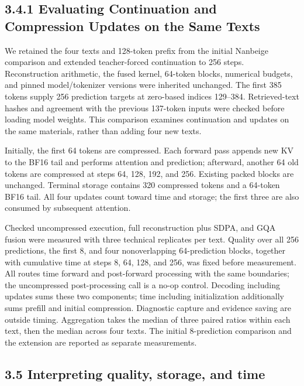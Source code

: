 \documentclass[10pt,a4paper]{article}
\begin{document}
\subsection{3.4.1 Evaluating Continuation and Compression Updates on the Same Texts}\label{evaluating-continuation-and-compression-updates-on-the-same-texts}

We retained the four texts and 128-token prefix from the initial Nanbeige comparison and extended teacher-forced continuation to 256 steps. Reconstruction arithmetic, the fused kernel, 64-token blocks, numerical budgets, and pinned model/tokenizer versions were inherited unchanged. The first 385 tokens supply 256 prediction targets at zero-based indices 129--384. Retrieved-text hashes and agreement with the previous 137-token inputs were checked before loading model weights. This comparison examines continuation and updates on the same materials, rather than adding four new texts.

Initially, the first 64 tokens are compressed. Each forward pass appends new KV to the BF16 tail and performs attention and prediction; afterward, another 64 old tokens are compressed at steps 64, 128, 192, and 256. Existing packed blocks are unchanged. Terminal storage contains 320 compressed tokens and a 64-token BF16 tail. All four updates count toward time and storage; the first three are also consumed by subsequent attention.

Checked uncompressed execution, full reconstruction plus SDPA, and GQA fusion were measured with three technical replicates per text. Quality over all 256 predictions, the first 8, and four nonoverlapping 64-prediction blocks, together with cumulative time at steps 8, 64, 128, and 256, was fixed before measurement. All routes time forward and post-forward processing with the same boundaries; the uncompressed post-processing call is a no-op control. Decoding including updates sums these two components; time including initialization additionally sums prefill and initial compression. Diagnostic capture and evidence saving are outside timing. Aggregation takes the median of three paired ratios within each text, then the median across four texts. The initial 8-prediction comparison and the extension are reported as separate measurements.

\subsection{3.5 Interpreting quality, storage, and time}\label{interpreting-quality-storage-and-time}
\end{document}
